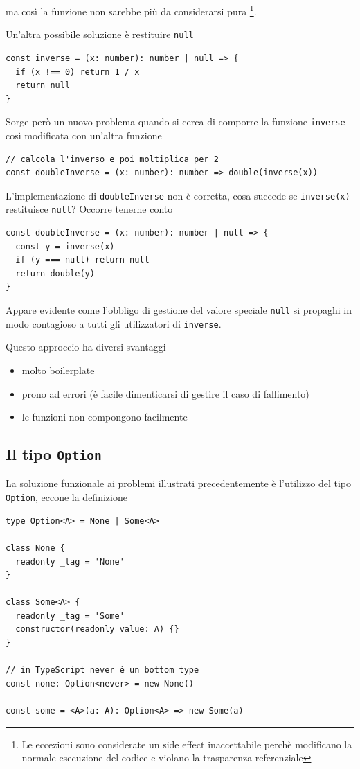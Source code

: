 \documentclass[12pt]{article}
\begin{document}
ma così la funzione non sarebbe più da considerarsi pura
\footnote{Le eccezioni sono considerate un side effect inaccettabile perchè modificano la normale esecuzione del codice
e violano la trasparenza referenziale}.

Un'altra possibile soluzione è restituire \texttt{null}

\begin{verbatim}
const inverse = (x: number): number | null => {
  if (x !== 0) return 1 / x
  return null
}
\end{verbatim}

Sorge però un nuovo problema quando si cerca di comporre la funzione \texttt{inverse} così modificata con un'altra funzione

\begin{verbatim}
// calcola l'inverso e poi moltiplica per 2
const doubleInverse = (x: number): number => double(inverse(x))
\end{verbatim}

L'implementazione di \texttt{doubleInverse} non è corretta, cosa succede se \texttt{inverse(x)} restituisce \texttt{null}?
Occorre tenerne conto

\begin{verbatim}
const doubleInverse = (x: number): number | null => {
  const y = inverse(x)
  if (y === null) return null
  return double(y)
}
\end{verbatim}

Appare evidente come l'obbligo di gestione del valore speciale \texttt{null} si propaghi in modo contagioso
a tutti gli utilizzatori di \texttt{inverse}.

Questo approccio ha diversi svantaggi

\begin{itemize}
  \item molto boilerplate
  \item prono ad errori (è facile dimenticarsi di gestire il caso di fallimento)
  \item le funzioni non compongono facilmente
\end{itemize}

\subsection{Il tipo \texttt{Option}}

La soluzione funzionale ai problemi illustrati precedentemente è l'utilizzo del tipo \texttt{Option},
eccone la definizione

\begin{verbatim}
type Option<A> = None | Some<A>

class None {
  readonly _tag = 'None'
}

class Some<A> {
  readonly _tag = 'Some'
  constructor(readonly value: A) {}
}

// in TypeScript never è un bottom type
const none: Option<never> = new None()

const some = <A>(a: A): Option<A> => new Some(a)
\end{verbatim}
\end{document}
